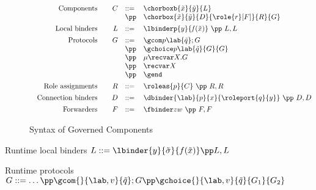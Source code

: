 

\begin{figure}[t]
$$
\begin{array}{c}
  \begin{array}{r@{\qquad}rl@{\quad}ll@{\qquad}l}
    \text{Components} &
     C & ::= & \chorboxb {\tilde x}{\tilde y}{L} \\
            && \pp & \chorbox {\tilde x}{\tilde y}{D}{\role{r}[F]}{R}{G}
            \\[1ex]
	\text{Local binders} & L & ::=  &
                \lbinderp{y} {\mathit{f}(\tilde{x})} \ \pp \
                 L,L
    \\[1ex]
    \text{Protocols} & G &::=  & \gcom p \lab{\tilde  q};G  \\
            && \pp     & \gchoice p\lab{ \tilde q} {G}{G} \\ 
            && \pp     & \mu\recvar X.G \\ 
            && \pp     & \recvar X \\ 
            && \pp     & \gend 
    \\[1ex]
    \text{Role assignments} & R & ::= & \roleas{p}{C} \ \pp \  R,R
    \\[1ex]
    \text{Connection binders} & D & ::= &
             \dbinder{\lab}{p}{x}
            {\roleport{q}{y}}  \ \pp \  D,D
               \\[1ex]
    \text{Forwarders} & F & ::=  &
                \fbinder zw \ \pp \   F,F
                & 
  \end{array}
\end{array}
$$
\caption{Syntax of Governed Components}
\label{fig:gc_syntax}
\end{figure}

Runtime local binders
$L ::= \lbinder{y}{\tilde \sigma}{f(\tilde x)} \pp L,L$

Runtime protocols
$G ::= \ldots \pp \gcom {}{\lab,v}{\tilde q};G \pp
\gchoice{}{\lab,v}{\tilde q}{G_1}{G_2} $



